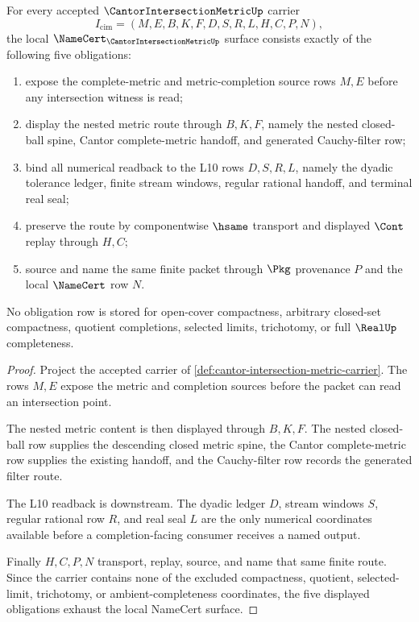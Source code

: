 \begin{theorem}
\label{thm:cantor-intersection-metric-namecert-obligations}
For every accepted $\CantorIntersectionMetricUp$ carrier
$$
I_{\mathrm{cim}}=(M,E,B,K,F,D,S,R,L,H,C,P,N),
$$
the local $\NameCert_{\CantorIntersectionMetricUp}$ surface consists exactly of the following five obligations:
\begin{enumerate}
\item expose the complete-metric and metric-completion source rows $M,E$ before any intersection witness is read;
\item display the nested metric route through $B,K,F$, namely the nested closed-ball spine, Cantor complete-metric handoff, and generated Cauchy-filter row;
\item bind all numerical readback to the L10 rows $D,S,R,L$, namely the dyadic tolerance ledger, finite stream windows, regular rational handoff, and terminal real seal;
\item preserve the route by componentwise $\hsame$ transport and displayed $\Cont$ replay through $H,C$;
\item source and name the same finite packet through $\Pkg$ provenance $P$ and the local $\NameCert$ row $N$.
\end{enumerate}
No obligation row is stored for open-cover compactness, arbitrary closed-set compactness, quotient completions, selected limits, trichotomy, or full $\RealUp$ completeness.
\end{theorem}
\begin{proof}
Project the accepted carrier of \autoref{def:cantor-intersection-metric-carrier}. The rows $M,E$ expose the metric and completion sources before the packet can read an intersection point.

The nested metric content is then displayed through $B,K,F$. The nested closed-ball row supplies the descending closed metric spine, the Cantor complete-metric row supplies the existing handoff, and the Cauchy-filter row records the generated filter route.

The L10 readback is downstream. The dyadic ledger $D$, stream windows $S$, regular rational row $R$, and real seal $L$ are the only numerical coordinates available before a completion-facing consumer receives a named output.

Finally $H,C,P,N$ transport, replay, source, and name that same finite route. Since the carrier contains none of the excluded compactness, quotient, selected-limit, trichotomy, or ambient-completeness coordinates, the five displayed obligations exhaust the local NameCert surface.
\end{proof}


